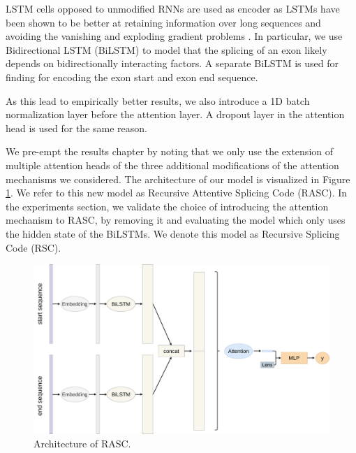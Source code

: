 LSTM cells opposed to unmodified RNNs are used as encoder as LSTMs have been shown to be better at retaining information over long sequences and avoiding the vanishing and exploding gradient problems \cite{lstm}. In particular, we use Bidirectional LSTM (BiLSTM) \cite{bidirection} to model that the splicing of an exon likely depends on bidirectionally interacting factors. A separate BiLSTM is used for finding for encoding the exon start and exon end sequence. 

As this lead to empirically better results, we also introduce a 1D batch normalization layer before the attention layer. A dropout layer in the attention head is used for the same reason. 

We pre-empt the results chapter by noting that we only use the extension of multiple attention heads of the three additional modifications of the attention mechanisms we considered. 
The architecture of our model is visualized in Figure \ref{fig:attnbilstm}. We refer to this new model as Recursive Attentive Splicing Code (RASC). In the experiments section, we validate the choice of introducing the attention mechanism to RASC, by removing it and evaluating the model which only uses the hidden state of the BiLSTMs. We denote this model as Recursive Splicing Code (RSC).
\begin{figure}
	\centering\includegraphics[width=1\textwidth]{../visualizations/ch4-methods/visualizations-AttnBiLSTM.pdf} 
	\caption{Architecture of RASC. }
	\label{fig:attnbilstm}
\end{figure}


